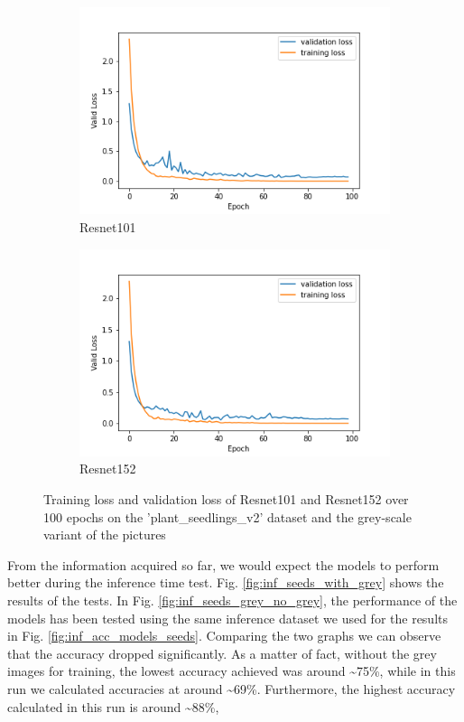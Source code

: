      
\begin{figure}[h]
\begin{subfigure}{0.5\textwidth}
     \centering
	    \includegraphics[width = \gws cm]{epoch_valid_loss_resnet101_2.png}
\caption{Resnet101}\label{fig:epoch_valid_loss_resnet101_2}
     \end{subfigure}
\begin{subfigure}{0.5\textwidth}
     \centering
	    \includegraphics[width = \gws cm]{epoch_valid_loss_resnet152_2.png}
\caption{Resnet152}\label{fig:epoch_valid_loss_resnet152_2}
     \end{subfigure}  
     \caption{Training loss and validation loss of Resnet101 and Resnet152 over 100 epochs on the  'plant\_seedlings\_v2' dataset and the grey-scale variant of the pictures}
        \label{fig:tran_valid_loss_seeds_res_100_2}
\end{figure}
From the information acquired so far, we would expect the models to perform better during the inference time test. Fig. \ref{fig:inf_seeds_with_grey} shows the results of the tests. In Fig. \ref{fig:inf_seeds_grey_no_grey}, the performance of the models has been tested using the same inference dataset we used for the results in Fig. \ref{fig:inf_acc_models_seeds}. Comparing the two graphs we can observe that the accuracy dropped significantly. As a matter of fact, without the grey images for training, the lowest accuracy achieved was around \textasciitilde75\%, while in this run we calculated accuracies at around \textasciitilde69\%. Furthermore, the highest accuracy calculated in this run is around \textasciitilde88\%,
